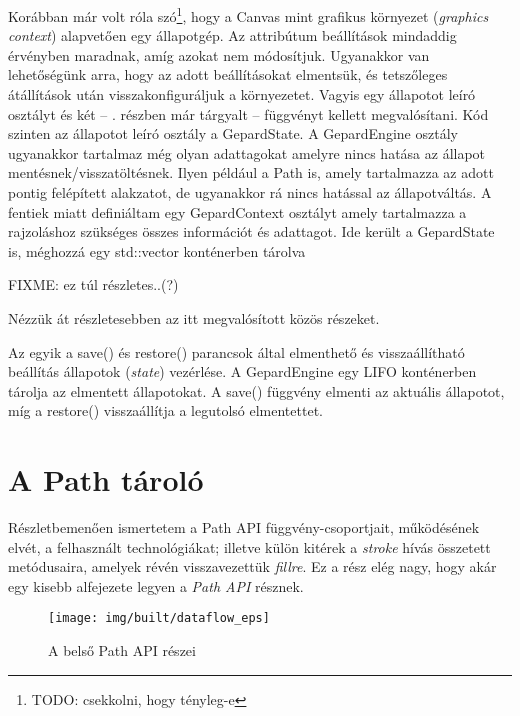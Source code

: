 \documentclass[12pt]{report}
\theoremstyle{definition}
\newcommand{\inenglish}[1]{\textsl{#1}}
\newcommand{\func}[1]{{\textsf{\footnotesize#1}}}
\begin{document}
  Korábban már volt róla szó\footnote{TODO: csekkolni, hogy tényleg-e}, hogy
a Canvas mint grafikus környezet (\inenglish{graphics context}) alapvetően egy
állapotgép. Az attribútum beállítások mindaddig érvényben maradnak, amíg azokat
nem módosítjuk. Ugyanakkor van lehetőségünk arra, hogy az adott beállításokat
elmentsük, és tetszőleges átállítások után visszakonfiguráljuk a környezetet.
Vagyis egy állapotot leíró osztályt és két -- . részben
már tárgyalt -- függvényt kellett megvalósítani. Kód szinten az állapotot leíró
osztály a \func{GepardState}. A \func{GepardEngine} osztály ugyanakkor tartalmaz
még olyan adattagokat amelyre nincs hatása az állapot
mentésnek/visszatöltésnek. Ilyen például a Path is, amely tartalmazza az
adott pontig felépített alakzatot, de ugyanakkor rá nincs hatással az
állapotváltás.
  A fentiek miatt definiáltam egy \func{GepardContext} osztályt amely
tartalmazza a rajzoláshoz szükséges összes információt és adattagot. Ide
került a \func{GepardState} is, méghozzá egy std::vector konténerben tárolva

  FIXME: ez túl részletes..(?)

  Nézzük át részletesebben az itt megvalósított közös részeket.

  Az egyik a \func{save()} és \func{restore()} parancsok által elmenthető
és visszaállítható beállítás állapotok (\inenglish{state}) vezérlése.
A GepardEngine egy LIFO konténerben tárolja az elmentett állapotokat. A
\func{save()} függvény elmenti az aktuális állapotot, míg a
\func{restore()} visszaállítja a legutolsó elmentettet.


    \section[A Path tároló]{A Path tároló}
    \label{A Path tároló}

Részletbemenően ismertetem a Path API függvény-csoportjait,
működésének elvét, a felhasznált technológiákat; illetve külön
kitérek a \emph{stroke} hívás összetett metódusaira, amelyek révén
visszavezettük \emph{fillre}. Ez a rész elég nagy, hogy akár egy kisebb
alfejezete legyen a \emph{Path API} résznek.

    \begin{wrapfigure}{l}{0.5\textwidth}
    \begin{center}
      \texttt{[image: img/built/dataflow\_eps]}
    \end{center}
      \caption{\label{dataflow-path-API-diagram} A belső Path API
      részei}
    \end{wrapfigure}
\end{document}
